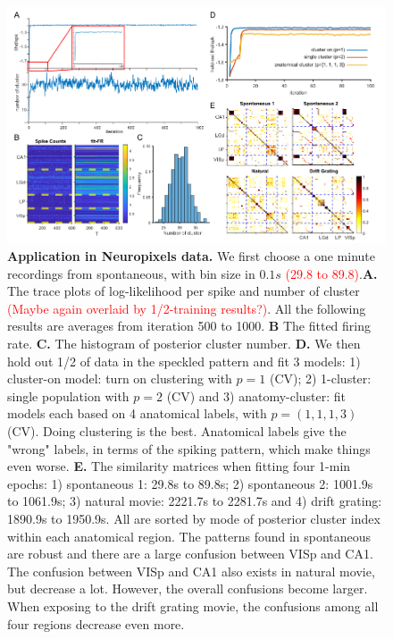 \documentclass{article}
\begin{document}
	\begin{figure}[h!]
		\centering
		\includegraphics[width=1\textwidth]{figure4.jpg}
		\caption{\textbf{Application in Neuropixels data.} We first choose a one minute recordings from spontaneous, with bin size in $0.1s$ \textcolor{red}{(29.8 to 89.8)}.\textbf{A.} The trace plots of log-likelihood per spike and number of cluster \textcolor{red}{(Maybe again overlaid by 1/2-training results?)}. All the following results are averages from iteration 500 to 1000. \textbf{B} The fitted firing rate. \textbf{C.} The histogram of posterior cluster number. \textbf{D.} We then hold out 1/2 of data in the speckled pattern and fit 3 models: 1) cluster-on model: turn on clustering with $p=1$ (CV); 2) 1-cluster: single population with $p=2$ (CV) and 3) anatomy-cluster: fit models each based on 4 anatomical labels, with $p=(1,1,1,3)$ (CV). Doing clustering is the best. Anatomical labels give the "wrong" labels, in terms of the spiking pattern, which make things even worse. \textbf{E.} The similarity matrices when fitting four 1-min epochs: 1) spontaneous 1: 29.8s to 89.8s; 2) spontaneous 2: 1001.9s to 1061.9s; 3) natural movie: 2221.7s to 2281.7s and 4) drift grating: 1890.9s to 1950.9s. All are sorted by mode of posterior cluster index within each anatomical region. The patterns found in spontaneous are robust and there are a large confusion between VISp and CA1. The confusion between VISp and CA1 also exists in natural movie, but decrease a lot. However, the overall confusions become larger. When exposing to the drift grating movie, the confusions among all four regions decrease even more.}
	\end{figure}
	
	
	
\end{document}
